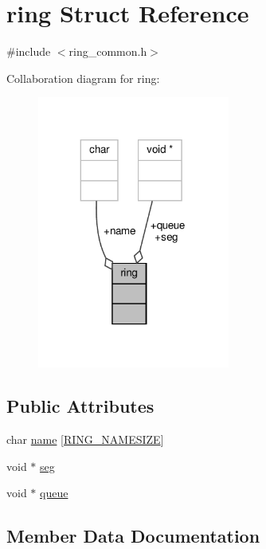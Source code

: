 \hypertarget{structring}{}\section{ring Struct Reference}
\label{structring}


{\ttfamily \#include $<$ring\+\_\+common.\+h$>$}



Collaboration diagram for ring\+:
\nopagebreak
\begin{figure}[H]
\begin{center}
\leavevmode
\includegraphics[width=179pt]{structring__coll__graph}
\end{center}
\end{figure}
\subsection*{Public Attributes}
\begin{DoxyCompactItemize}
\item 
char \hyperlink{structring_a2c8411443729f3ab234854faf0eb0c06}{name} \mbox{[}\hyperlink{ring__common_8h_af95a9ad1671f395fd7296f45f170ed3f}{R\+I\+N\+G\+\_\+\+N\+A\+M\+E\+S\+I\+ZE}\mbox{]}
\item 
void $\ast$ \hyperlink{structring_ac6f2ff647ec154774b1ce234518896e1}{seg}
\item 
void $\ast$ \hyperlink{structring_a7689f9d505751e61fdc221130489c26b}{queue}
\end{DoxyCompactItemize}


\subsection{Member Data Documentation}
\mbox{\label{structring_a2c8411443729f3ab234854faf0eb0c06}} 
